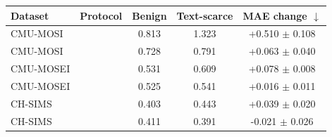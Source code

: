 
\begin{tabular}{llccc}
\toprule
Dataset & Protocol & Benign & Text-scarce & MAE change $\downarrow$ \\
\midrule
CMU-MOSI & \tokenlevel{} & 0.813 & 1.323 & +0.510 $\pm$ 0.108 \\
CMU-MOSI & \modlevel{} & 0.728 & 0.791 & +0.063 $\pm$ 0.040 \\
CMU-MOSEI & \tokenlevel{} & 0.531 & 0.609 & +0.078 $\pm$ 0.008 \\
CMU-MOSEI & \modlevel{} & 0.525 & 0.541 & +0.016 $\pm$ 0.011 \\
CH-SIMS & \tokenlevel{} & 0.403 & 0.443 & +0.039 $\pm$ 0.020 \\
CH-SIMS & \modlevel{} & 0.411 & 0.391 & -0.021 $\pm$ 0.026 \\
\bottomrule
\end{tabular}
